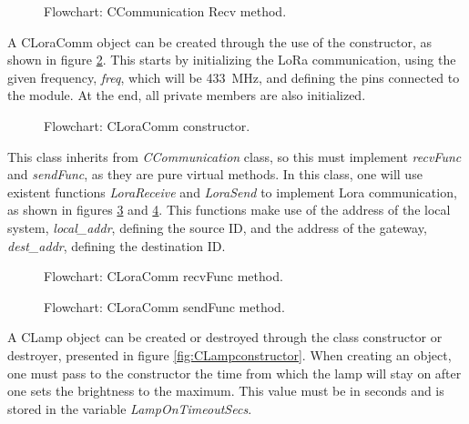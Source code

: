 \begin{figure}[H]
	\centering
	\caption{Flowchart: CCommunication Recv method.}
	\label{fig:CCommunicationrecv}
\end{figure}

\clearpage
{}

A CLoraComm object can be created through the use of the constructor, as shown in figure \ref{fig:LoraComm}.
This starts by initializing the LoRa communication, using the given frequency, \textit{freq}, which will be 433~MHz, and defining the pins connected to the module. At the end, all private members are also initialized.

\begin{figure}[H]
	\centering
	\caption{Flowchart: CLoraComm constructor.}
	\label{fig:LoraComm}
\end{figure}

This class inherits from \textit{CCommunication} class, so this must implement \textit{recvFunc} and \textit{sendFunc}, as they are pure virtual methods. In this class, one will use existent functions \textit{LoraReceive} and \textit{LoraSend} to implement Lora communication, as shown in figures \ref{fig:CLoraCommrecvfunc} and \ref{fig:CLoraCommsendfunc}. This functions make use of the address of the local system, \textit{local\_addr}, defining the source ID, and the address of the gateway, \textit{dest\_addr}, defining the destination ID.

\begin{figure}[H]
	\centering
	\caption{Flowchart: CLoraComm recvFunc method.}
	\label{fig:CLoraCommrecvfunc}
\end{figure}

\begin{figure}[H]
	\centering
	\caption{Flowchart: CLoraComm sendFunc method.}
	\label{fig:CLoraCommsendfunc}
\end{figure}


\clearpage
{}

A CLamp object can be created or destroyed through the class constructor or destroyer, presented in figure \ref{fig:CLampconstructor}. When creating an object, one must pass to the constructor the time from which the lamp will stay on after one sets the brightness to the maximum. This value must be in seconds and is stored in the variable \textit{LampOnTimeoutSecs}.


